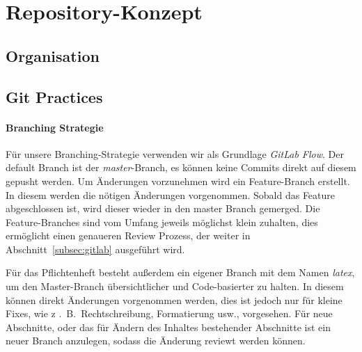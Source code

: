 \section{Repository-Konzept}\label{sec:repository-konzept}


\subsection{Organisation}\label{subsec:organisation}

\subsection{Git Practices}\label{subsec:git}

\paragraph{Branching Strategie}
Für unsere Branching-Strategie verwenden wir als Grundlage \textit{GitLab Flow}.
Der default Branch ist der \textit{master}-Branch, es können keine Commits direkt auf diesem
gepusht werden.
Um Änderungen vorzunehmen wird ein Feature-Branch erstellt.
In diesem werden die nötigen Änderungen vorgenommen.
Sobald das Feature abgeschlossen ist, wird dieser wieder in den master Branch gemerged.
Die Feature-Branches sind vom Umfang jeweils möglichst klein zuhalten, dies ermöglicht einen
genaueren Review Prozess, der weiter in Abschnitt~\ref{subsec:gitlab} ausgeführt wird.

Für das Pflichtenheft besteht außerdem ein eigener Branch mit dem Namen \textit{latex}, um den
Master-Branch übersichtlicher und Code-basierter zu halten.
In diesem können direkt Änderungen vorgenommen werden, dies ist jedoch nur für kleine Fixes, wie z
.\ B.\ Rechtschreibung, Formatierung usw., vorgesehen.
Für neue Abschnitte, oder das für Ändern des Inhaltes bestehender Abschnitte ist ein neuer Branch
anzulegen, sodass die Änderung reviewt werden können.

